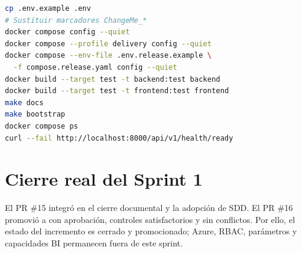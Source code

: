\begin{lstlisting}[style=terminal,language=bash]
cp .env.example .env
# Sustituir marcadores ChangeMe_*
docker compose config --quiet
docker compose --profile delivery config --quiet
docker compose --env-file .env.release.example \
  -f compose.release.yaml config --quiet
docker build --target test -t backend:test backend
docker build --target test -t frontend:test frontend
make docs
make bootstrap
docker compose ps
curl --fail http://localhost:8000/api/v1/health/ready
\end{lstlisting}

\section{Cierre real del Sprint 1}

El PR \#15 integró en  el cierre documental y la adopción de SDD. El PR \#16 promovió  a  con aprobación, controles satisfactorios y sin conflictos. Por ello, el estado del incremento es cerrado y promocionado; Azure, RBAC, parámetros y capacidades BI permanecen fuera de este sprint.
